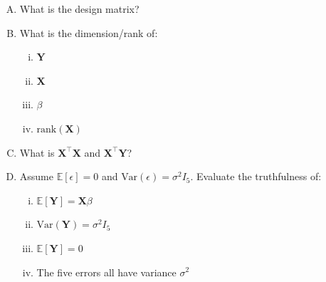 \documentclass[12pt,letterpaper, onecolumn]{exam}
\begin{document}
\begin{questions}
    \begin{enumerate}[A.)]
        \item What is the design matrix?
        \item What is the dimension/rank of: 
        \begin{enumerate}[i.)]
            \item $\textbf{Y}$
            \item $\textbf{X}$
            \item $\beta$
            \item $\text{rank}(\textbf{X})$
        \end{enumerate}
        \item What is $\textbf{X}^\intercal\textbf{X}$ and $\textbf{X}^\intercal\textbf{Y}$?
        \item Assume $\mathbb{E}[\epsilon]=0$ and $\text{Var}(\epsilon)=\sigma^2I_5$. Evaluate the truthfulness of:
        \begin{enumerate}[i.)]
            \item $\mathbb{E}[\textbf{Y}]=\textbf{X}\beta$
            \item $\text{Var}(\textbf{Y})=\sigma^2I_5$
            \item $\mathbb{E}[\textbf{Y}]=0$
            \item The five errors all have variance $\sigma^2$
        \end{enumerate}
    \end{enumerate}
    
    \begin{solution}


\end{solution}
\end{questions}
\end{document}
